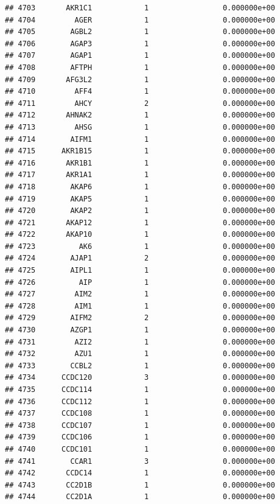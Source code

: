 \documentclass[
]{article}
\begin{document}
\begin{verbatim}
## 4703       AKR1C1            1                 0.000000e+00
## 4704         AGER            1                 0.000000e+00
## 4705        AGBL2            1                 0.000000e+00
## 4706        AGAP3            1                 0.000000e+00
## 4707        AGAP1            1                 0.000000e+00
## 4708        AFTPH            1                 0.000000e+00
## 4709       AFG3L2            1                 0.000000e+00
## 4710         AFF4            1                 0.000000e+00
## 4711         AHCY            2                 0.000000e+00
## 4712       AHNAK2            1                 0.000000e+00
## 4713         AHSG            1                 0.000000e+00
## 4714        AIFM1            1                 0.000000e+00
## 4715      AKR1B15            1                 0.000000e+00
## 4716       AKR1B1            1                 0.000000e+00
## 4717       AKR1A1            1                 0.000000e+00
## 4718        AKAP6            1                 0.000000e+00
## 4719        AKAP5            1                 0.000000e+00
## 4720        AKAP2            1                 0.000000e+00
## 4721       AKAP12            1                 0.000000e+00
## 4722       AKAP10            1                 0.000000e+00
## 4723          AK6            1                 0.000000e+00
## 4724        AJAP1            2                 0.000000e+00
## 4725        AIPL1            1                 0.000000e+00
## 4726          AIP            1                 0.000000e+00
## 4727         AIM2            1                 0.000000e+00
## 4728         AIM1            1                 0.000000e+00
## 4729        AIFM2            2                 0.000000e+00
## 4730        AZGP1            1                 0.000000e+00
## 4731         AZI2            1                 0.000000e+00
## 4732         AZU1            1                 0.000000e+00
## 4733        CCBL2            1                 0.000000e+00
## 4734      CCDC120            3                 0.000000e+00
## 4735      CCDC114            1                 0.000000e+00
## 4736      CCDC112            1                 0.000000e+00
## 4737      CCDC108            1                 0.000000e+00
## 4738      CCDC107            1                 0.000000e+00
## 4739      CCDC106            1                 0.000000e+00
## 4740      CCDC101            1                 0.000000e+00
## 4741        CCAR1            3                 0.000000e+00
## 4742       CCDC14            1                 0.000000e+00
## 4743       CC2D1B            1                 0.000000e+00
## 4744       CC2D1A            1                 0.000000e+00

\end{verbatim}
\end{document}
